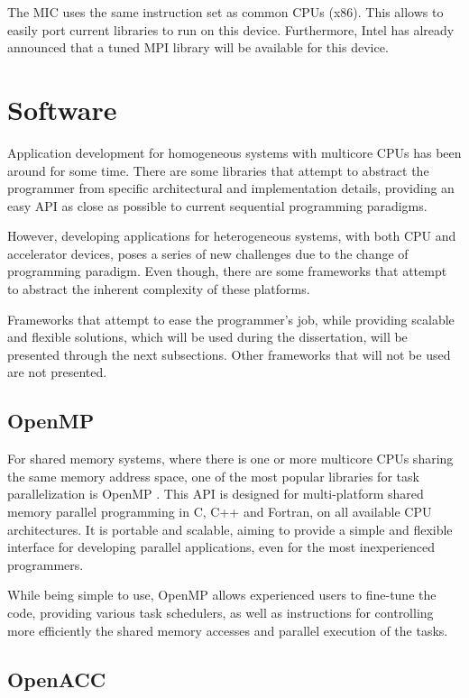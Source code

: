 The MIC uses the same instruction set as common \intel CPUs (x86). This allows to easily port current libraries to run on this device. Furthermore, Intel has already announced that a tuned MPI library will be available for this device.

\section{Software}

Application development for homogeneous systems with multicore CPUs has been around for some time. There are some libraries that attempt to abstract the programmer from specific architectural and implementation details, providing an easy API as close as possible to current sequential programming paradigms.

However, developing applications for heterogeneous systems, with both CPU and accelerator devices, poses a series of new challenges due to the change of programming paradigm. Even though, there are some frameworks that attempt to abstract the inherent complexity of these platforms.

Frameworks that attempt to ease the programmer’s job, while providing scalable and flexible solutions, which will be used during the dissertation, will be presented through the next subsections. Other frameworks that will not be used are not presented.

\subsection{OpenMP}

For shared memory systems, where there is one or more multicore CPUs sharing the same memory address space, one of the most popular libraries for task parallelization is OpenMP \cite{OpenMP}. This API is designed for multi-platform shared memory parallel programming in C, C++ and Fortran, on all available CPU architectures. It is portable and scalable, aiming to provide a simple and flexible interface for developing parallel applications, even for the most inexperienced programmers.

While being simple to use, OpenMP allows experienced users to fine-tune the code, providing various task schedulers, as well as instructions for controlling more efficiently the shared memory accesses and parallel execution of the tasks.

\subsection{OpenACC}

